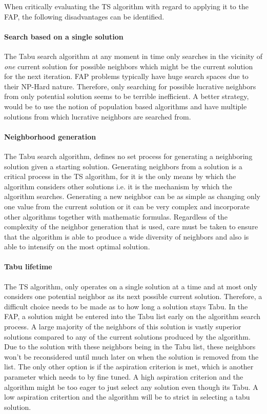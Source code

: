 When critically evaluating the TS algorithm with regard to applying it to the FAP, the following disadvantages can be identified.
\paragraph{Search based on a single solution}
The Tabu search algorithm at any moment in time only searches in the vicinity of \emph{one} current solution for possible neighbors which might be the current solution for the next iteration. FAP problems typically have huge search spaces due to their NP-Hard nature. Therefore, only searching for possible lucrative neighbors from only potential solution seems to be terrible inefficient. A better strategy, would be to use the notion of population based algorithms and have multiple solutions from which lucrative neighbors are searched from.
\paragraph{Neighborhood generation}
The Tabu search algorithm, defines no set process for generating a neighboring solution given a starting solution. Generating neighbors from a solution is a critical process in the TS algorithm, for it is the only means by which the algorithm considers other solutions i.e. it is the mechanism by which the algorithm searches. Generating a new neighbor can be as simple as changing only one value from the current solution or it can be very complex and incorporate other algorithms together with mathematic formulas. Regardless of the complexity of the neighbor generation that is used, care must be taken to ensure that the algorithm is able to produce a wide diversity of neighbors and also is able to intensify on the most optimal solution.
\paragraph{Tabu lifetime}
The TS algorithm, only operates on a single solution at a time and at most only considers one potential neighbor as its next possible current solution. Therefore, a difficult choice needs to be made as to how long a solution stays Tabu. In the FAP, a solution might be entered into the Tabu list early on the algorithm search process. A large majority of the neighbors of this solution is vastly superior solutions compared to any of the current solutions produced by the algorithm. Due to the solution with these neighbors being in the Tabu list, these neighbors won't be reconsidered until much later on when the solution is removed from the list. The only other option is if the aspiration criterion is met, which is another parameter which needs to by fine tuned. A high aspiration criterion and the algorithm might be too eager to just select any solution even though its Tabu. A low aspiration critertion and the algorithm will be to strict in selecting a tabu solution.

